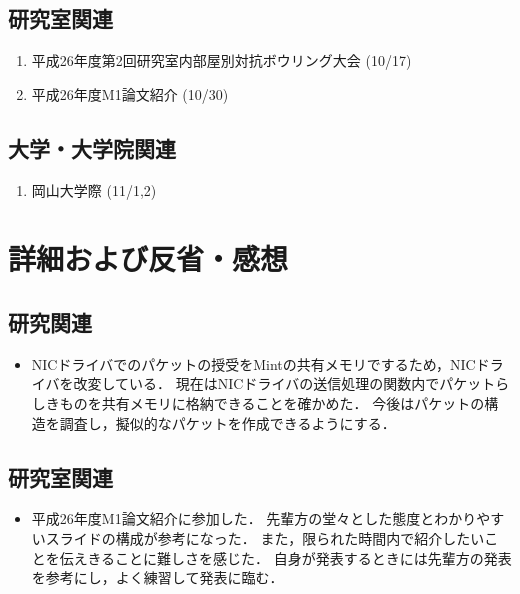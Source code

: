 \documentclass[fleqn, 14pt]{extarticle}
\begin{document}
\subsection{研究室関連}
\label{sec-2-2}
\begin{enumerate}
\item 平成26年度第2回研究室内部屋別対抗ボウリング大会
\hfill
\label{lab-ive1}
(10/17)
\item 平成26年度M1論文紹介
\hfill
\label{lab-ive1}
(10/30)
\end{enumerate}
\subsection{大学・大学院関連}
\label{sec-2-3}
\begin{enumerate}
\item 岡山大学際
\hfill
\label{enum-univ1}
(11/1,2)
\end{enumerate}





\section{詳細および反省・感想}
\label{sec-3}
\subsection{研究関連}
\label{sec-3-1}

\begin{itemize}
\item[(\ref{enum-1-D})]
NICドライバでのパケットの授受をMintの共有メモリでするため，NICドライバを改変している．
現在はNICドライバの送信処理の関数内でパケットらしきものを共有メモリに格納できることを確かめた．
今後はパケットの構造を調査し，擬似的なパケットを作成できるようにする．
\end{itemize}

\subsection{研究室関連}
\begin{itemize}
\item[(\ref{lab-ive1})]
平成26年度M1論文紹介に参加した．
先輩方の堂々とした態度とわかりやすいスライドの構成が参考になった．
また，限られた時間内で紹介したいことを伝えきることに難しさを感じた．
自身が発表するときには先輩方の発表を参考にし，よく練習して発表に臨む．
\end{itemize}
\end{document}
